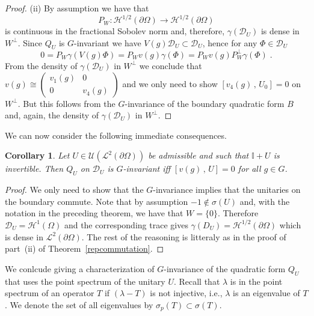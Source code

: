 \documentclass[a4paper,12pt]{amsart}
\renewcommand{\H}{\mathcal{H}}
\renewcommand{\L}{\mathcal{L}}
\newcommand{\D}{\mathcal{D}}
\newcommand{\pO}{{\partial \Omega}}
\newcommand{\1}{\mathbb{I}}
\newtheorem{corollary}[theorem]{Corollary}
\numberwithin{equation}{section}
\numberwithin{theorem}{section}
\begin{document}
\begin{proof}
(ii) By assumption we have that
\[
 P_W\colon\H^{1/2}(\pO)\to\H^{1/2}(\pO)
\]
is continuous in the fractional Sobolev norm and, therefore, $\gamma(\D_U)$ is dense in $W^\perp$. Since $Q_U$ is $G$-invariant
we have $V(g)\D_U\subset \D_U$, hence for any $\Phi\in\D_U$
\[
 0= P_W \gamma(V(g)\Phi) = P_W v(g) \gamma(\Phi) = P_W v(g) P_W^\perp \gamma(\Phi) \;.
\]
From the density of  $\gamma(\D_U)$ in $W^\perp$ we conclude that 
$v(g)\cong
\begin{pmatrix}
v_1(g) & 0 \\ 0 & v_4(g)
\end{pmatrix}
$
and we only need to show $[v_4 (g)\,,\,U_0]=0$ on $W^\perp$. But this follows from the $G$-invariance
of the boundary quadratic form $B$ and, again, the density of  $\gamma(\D_U)$ in $W^\perp$.
\end{proof}

We can now consider the following immediate consequences. 
\begin{corollary}\label{cor:1}
Let $U\in\mathcal{U}(\L^2(\pO))$ be admissible and such that $\1+U$ is invertible. Then 
$Q_U$ on $\D_U$ is $G$-invariant iff $[v (g)\,,\,U]=0$ for all $g\in G$.
\end{corollary}
\begin{proof}
We only need to show that the $G$-invariance implies that the unitaries on the boundary commute.
Note that by assumption $-1\not\in\sigma(U)$ and, with the notation in the preceding theorem, we have
that $W=\{0\}$. Therefore $\D_U=\H^1(\Omega)$ and the corresponding trace gives 
$\gamma(D_U)=\H^{1/2}(\pO)$ which is dense in $\L^2(\pO)$. The rest of the reasoning is litteraly as
in the proof of part~(ii) of Theorem~\ref{repcommutation}.
\end{proof}

We conlcude giving a characterization of $G$-invariance of the quadratic form $Q_U$ 
that uses the point spectrum of the unitary $U$. Recall that $\lambda$ is in the point spectrum
of an operator $T$ if $(\lambda-T)$ is not injective, i.e., $\lambda$ is an eigenvalue 
of $T$. We denote the set of all eigenvalues by $\sigma_p(T)\subset\sigma(T)$.
\end{document}
